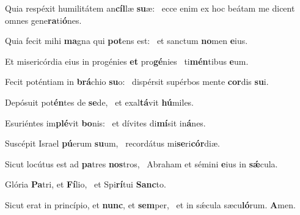 \item Quia respéxit humilitátem an\textbf{cíl}læ \textbf{su}æ:~\psstar{} ecce enim ex hoc beátam me dicent omnes gene\textbf{ra}ti\textbf{ó}nes.

\item Quia fecit mihi \textbf{ma}gna qui \textbf{pot}ens est:~\psstar{} et sanctum \textbf{no}men \textbf{e}ius.

\item Et misericórdia eius in progénies \textbf{et} pro\textbf{gé}nies~\psstar{} ti\textbf{mén}tibus \textbf{e}um.

\item Fecit poténtiam in \textbf{brá}chio \textbf{su}o:~\psstar{} dispérsit supérbos mente \textbf{cor}dis \textbf{su}i.

\item Depósuit pot\textbf{én}tes de \textbf{se}de,~\psstar{} et exal\textbf{tá}vit \textbf{hú}miles.

\item Esuriéntes im\textbf{plé}vit \textbf{bo}nis:~\psstar{} et dívites di\textbf{mí}sit in\textbf{á}nes.

\item Suscépit Israel \textbf{pú}erum \textbf{su}um,~\psstar{} recordátus mi\textbf{se}ri\textbf{cór}diæ.

\item Sicut locútus est ad \textbf{pa}tres \textbf{nos}tros,~\psstar{} Abraham et sémini \textbf{e}ius in \textbf{sǽ}cula.

\item Glória \textbf{Pa}tri, et \textbf{Fí}lio,~\psstar{} et Spi\textbf{rí}tui \textbf{Sanc}to.

\item Sicut erat in princípio, et \textbf{nunc}, et \textbf{sem}per,~\psstar{} et in sǽcula sæcu\textbf{ló}rum. \textbf{A}men.